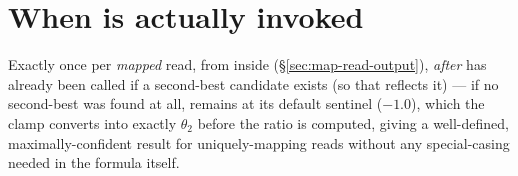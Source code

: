 \section{When is  actually invoked}

Exactly once per \emph{mapped} read, from inside 
(\S\ref{sec:map-read-output}), \emph{after}  has already been called if a
second-best candidate exists (so that  reflects it) --- if no second-best was
found at all,  remains at its default sentinel ($-1.0$), which the clamp
 converts into exactly $\theta_2$ before the
ratio is computed, giving a well-defined, maximally-confident result for uniquely-mapping reads
without any special-casing needed in the formula itself.

